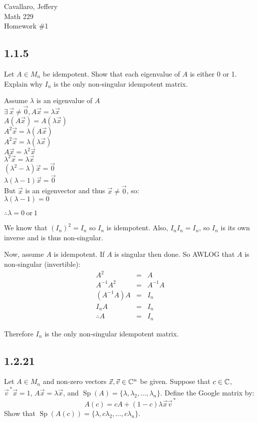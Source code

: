 \documentclass[letterpaper,12pt,fleqn]{article}
\renewcommand{\l}{\lambda}
\newcommand{\vx}{\vec{x}}
\newcommand{\vv}{\vec{v}}
\newcommand{\vz}{\vec{0}}
\DeclareMathOperator{\Sp}{Sp}
\begin{document}
Cavallaro, Jeffery \\
Math 229 \\
Homework \#1

\bigskip

\subsection*{1.1.5}

Let $A\in M_n$ be idempotent. Show that each eigenvalue of $A$ is either
0 or 1. Explain why $I_n$ is the only non-singular idempotent matrix.

Assume $\l$ is an eigenvalue of $A$ \\
$\exists\,\vx\ne\vz,A\vx=\l\vx$ \\
$A(A\vx)=A(\l\vx)$ \\
$A^2\vx=\l(A\vx)$ \\
$A^2\vx=\l(\l\vx)$ \\
$A\vx=\l^2\vx$ \\
$\l^2\vx=\l\vx$ \\
$(\l^2-\l)\vx=\vz$ \\
$\l(\l-1)\vx=\vz$ \\
But $\vx$ is an eigenvector and thus $\vx\ne\vz$, so: \\
$\l(\l-1)=0$

$\therefore \l=0\ \mbox{or}\ 1$

We know that $(I_n)^2=I_n$ so $I_n$ is idempotent.
Also, $I_nI_n=I_n$, so $I_n$ is its own inverse and is thus non-singular.

Now, assume $A$ is idempotent. If $A$ is singular then done. So AWLOG that $A$
is non-singular (invertible):
\begin{eqnarray*}
  A^2 &=& A \\
  A^{-1}A^2 &=& A^{-1}A \\
  (A^{-1}A)A &=& I_n \\
  I_nA &=& I_n \\
  \therefore A &=& I_n
\end{eqnarray*}
  
Therefore $I_n$ is the only non-singular idempotent matrix.

\subsection*{1.2.21}

Let $A\in M_n$ and non-zero vectors $\vx,\vv\in\C^n$ be given. Suppose that
$c\in\mathbb{C}$, $\vv^{\,*}\vx=1$, $A\vx=\l\vx$, and $\Sp(A)=\{\l,\l_2,\ldots,\l_n\}$.
Define the Google matrix by:
\[A(c)=cA+(1-c)\l\vx\vv^{\,*}\]
Show that $\Sp(A(c))=\{\l,c\l_2,\ldots,c\l_n\}$.
\end{document}
